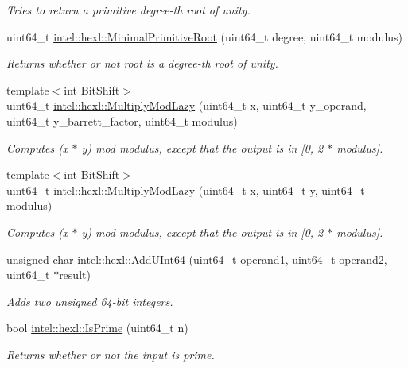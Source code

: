 \begin{DoxyCompactItemize}
\begin{DoxyCompactList}\small\item\em Tries to return a primitive degree-\/th root of unity. \end{DoxyCompactList}\item 
uint64\+\_\+t \hyperlink{namespaceintel_1_1hexl_adcc30a762adcbbdc9d7ebefa6fffe83b}{intel\+::hexl\+::\+Minimal\+Primitive\+Root} (uint64\+\_\+t degree, uint64\+\_\+t modulus)
\begin{DoxyCompactList}\small\item\em Returns whether or not root is a degree-\/th root of unity. \end{DoxyCompactList}\item 
{\footnotesize template$<$int Bit\+Shift$>$ }\\uint64\+\_\+t \hyperlink{namespaceintel_1_1hexl_ad7a9d35f74908eca9240bc7675705976}{intel\+::hexl\+::\+Multiply\+Mod\+Lazy} (uint64\+\_\+t x, uint64\+\_\+t y\+\_\+operand, uint64\+\_\+t y\+\_\+barrett\+\_\+factor, uint64\+\_\+t modulus)
\begin{DoxyCompactList}\small\item\em Computes (x $\ast$ y) mod modulus, except that the output is in \mbox{[}0, 2 $\ast$ modulus\mbox{]}. \end{DoxyCompactList}\item 
{\footnotesize template$<$int Bit\+Shift$>$ }\\uint64\+\_\+t \hyperlink{namespaceintel_1_1hexl_a8f6c714aff229c45fbba359cc67331a5}{intel\+::hexl\+::\+Multiply\+Mod\+Lazy} (uint64\+\_\+t x, uint64\+\_\+t y, uint64\+\_\+t modulus)
\begin{DoxyCompactList}\small\item\em Computes (x $\ast$ y) mod modulus, except that the output is in \mbox{[}0, 2 $\ast$ modulus\mbox{]}. \end{DoxyCompactList}\item 
unsigned char \hyperlink{namespaceintel_1_1hexl_a3ecce7e5a5591605703890fb3b2b6d80}{intel\+::hexl\+::\+Add\+U\+Int64} (uint64\+\_\+t operand1, uint64\+\_\+t operand2, uint64\+\_\+t $\ast$result)
\begin{DoxyCompactList}\small\item\em Adds two unsigned 64-\/bit integers. \end{DoxyCompactList}\item 
bool \hyperlink{namespaceintel_1_1hexl_a1155b31afc84bd8a7080d49b66480395}{intel\+::hexl\+::\+Is\+Prime} (uint64\+\_\+t n)
\begin{DoxyCompactList}\small\item\em Returns whether or not the input is prime. \end{DoxyCompactList}\item 

\end{DoxyCompactItemize}
